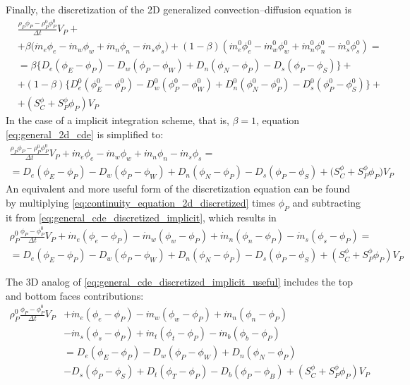 Finally, the discretization of the 2D generalized convection--diffusion equation is
\begin{align}
	&\frac{\rho_P \phi_P - \rho_P^0 \phi_P^0}{\Delta t} V_P + \nonumber \\
	&+ 
	\beta 
	\Big( \dot{m}_e \phi_e - \dot{m}_w \phi_w + \dot{m}_n \phi_n - \dot{m}_s \phi_s \Big) + 
	(1 - \beta) 
	\left( \dot{m}_e^0 \phi_e^0 - \dot{m}_w^0 \phi_w^0 + \dot{m}_n^0 \phi_n^0 - \dot{m}_s^0 \phi_s^0 \right) =  \nonumber \\
	&= 
	\beta 
	\Big\{ 
	D_e (\phi_E - \phi_P) - D_w (\phi_P - \phi_W) + D_n (\phi_N - \phi_P) - D_s (\phi_P - \phi_S) 
	\Big\} + \nonumber \\
	&+ (1 - \beta)
	\Big\{ 
	D_e^0 (\phi_E^0 - \phi_P^0) - D_w^0 (\phi_P^0 - \phi_W^0) + 
	D_n^0 (\phi_N^0 - \phi_P^0) - D_s^0 (\phi_P^0 - \phi_S^0)
	\Big\} + \nonumber \\
	&+ \left( S_C^\phi + S_P^\phi \phi_P \right) V_P \label{eq:general_2d_cde}
\end{align}
In the case of a implicit integration scheme, that is, $\beta = 1$, equation \eqref{eq:general_2d_cde} is simplified to:
\begin{multline} \label{eq:general_cde_discretized_implicit}
	\frac{\rho_P \phi_P - \rho_P^0 \phi_P^0}{\Delta t} V_P + 
	\dot{m}_e \phi_e - \dot{m}_w \phi_w + \dot{m}_n \phi_n - \dot{m}_s \phi_s = \\ = 
	D_e (\phi_E - \phi_P) - D_w (\phi_P - \phi_W) + D_n (\phi_N - \phi_P) - D_s (\phi_P - \phi_S) +
	\big( S_C^\phi + S_P^\phi \phi_P \big) V_P
\end{multline}
An equivalent and more useful form of the discretization equation can be found by multiplying \eqref{eq:continuity_equation_2d_discretized} times $\phi_P$ and subtracting it from \eqref{eq:general_cde_discretized_implicit}, which results in
\begin{multline} \label{eq:general_cde_discretized_implicit_useful}
	\rho_P^0 \frac{\phi_P - \phi_P^0}{\Delta t} V_P
	+ \dot{m}_e (\phi_e - \phi_P) - \dot{m}_w (\phi_w - \phi_P) 
	+ \dot{m}_n (\phi_n - \phi_P) - \dot{m}_s (\phi_s - \phi_P) 
	= \\
	= D_e (\phi_E - \phi_P) - D_w (\phi_P - \phi_W)
	+ D_n (\phi_N - \phi_P) - D_s (\phi_P - \phi_S)
	+ (S_C^\phi + S_P^\phi \phi_P) V_P
\end{multline}

The 3D analog of \eqref{eq:general_cde_discretized_implicit_useful} includes the top and bottom faces contributions:
\begin{align} \label{eq:general_cde_discretized_implicit_useful_3d}
	\rho_P^0 \frac{\phi_P - \phi_P^0}{\Delta t} V_P
	&+ \dot{m}_e (\phi_e - \phi_P) - \dot{m}_w (\phi_w - \phi_P)  + \dot{m}_n (\phi_n - \phi_P) 
	\nonumber \\
	&- \dot{m}_s (\phi_s - \phi_P) + \dot{m}_t (\phi_t - \phi_P) - \dot{m}_b (\phi_b - \phi_P) 
	\nonumber \\
	&= D_e (\phi_E - \phi_P) - D_w (\phi_P - \phi_W) + D_n (\phi_N - \phi_P) 
	\nonumber \\
	&- D_s (\phi_P - \phi_S) + D_t (\phi_T - \phi_P) - D_b (\phi_P - \phi_B) + (S_C^\phi + S_P^\phi \phi_P) V_P
\end{align}

